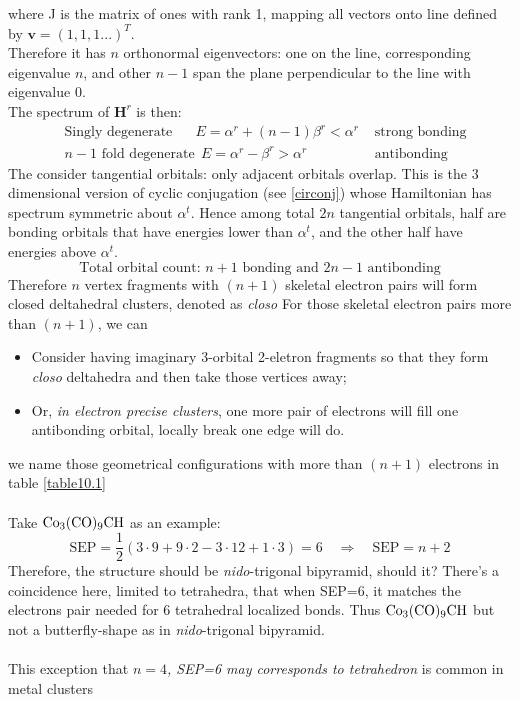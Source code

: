 where J is the matrix of ones with rank 1, mapping all vectors onto line defined by $\mathbf{v}=(1,1,1...)^{T}$.\\
Therefore it has $n$ orthonormal eigenvectors: 
one on the line, corresponding eigenvalue $n$, and other $n-1$ span the plane perpendicular to the line with eigenvalue 0.\\
The spectrum of $\mathbf{H}^r$ is then:
\begin{align*}
& \text{Singly degenerate}\quad\ \ \ E=\alpha^r + (n-1) \beta^r < \alpha^r & \text{ strong bonding}\\
& n-1 \text{ fold degenerate}\ \ E = \alpha^r - \beta^r > \alpha^r  & \text{ antibonding}
\end{align*}
The consider tangential orbitals: only adjacent orbitals overlap.
This is the 3 dimensional version of cyclic conjugation (see \ref{circonj}) whose Hamiltonian has spectrum symmetric about $\alpha^t$.
Hence among total $2n$ tangential orbitals, 
half are bonding orbitals that have energies lower than $\alpha^t$,
and the other half have energies above $\alpha^t$.
\[\boxed{\text{ Total orbital count: } n+1 \text{ bonding and } 2n-1 \text{ antibonding }}\]
Therefore $n$ vertex fragments with $(n+1)$ skeletal electron pairs will form closed deltahedral clusters, denoted as \emph{closo}
For those skeletal electron pairs more than $(n+1)$, we can
\begin{itemize}
\item Consider having imaginary 3-orbital 2-eletron fragments so that they form \emph{closo} deltahedra and then take those vertices away;
\item Or, \emph{in electron precise clusters}, one more pair of electrons will fill one antibonding orbital, locally break one edge will do.
\end{itemize}
we name those geometrical configurations with more than $(n+1)$ electrons in table \ref{table10.1}\\ \\
Take $\rm Co_3(CO)_9CH$ as an example: 
\[\text{SEP} = \frac{1}{2}(3\cdot9+9\cdot2-3\cdot12+1\cdot3)=6\quad\Rightarrow\quad \text{SEP}=n+2\]
Therefore, the structure should be \emph{nido}-trigonal bipyramid, should it?
There's a coincidence here, limited to tetrahedra, that when SEP=6, it matches the electrons pair needed for 6 tetrahedral localized bonds.
Thus $\rm Co_3(CO)_9CH$ but not a butterfly-shape as in \emph{nido}-trigonal bipyramid.\\ \\
This exception that \emph{$n=4$, SEP=6 may corresponds to tetrahedron} is common in metal clusters 
